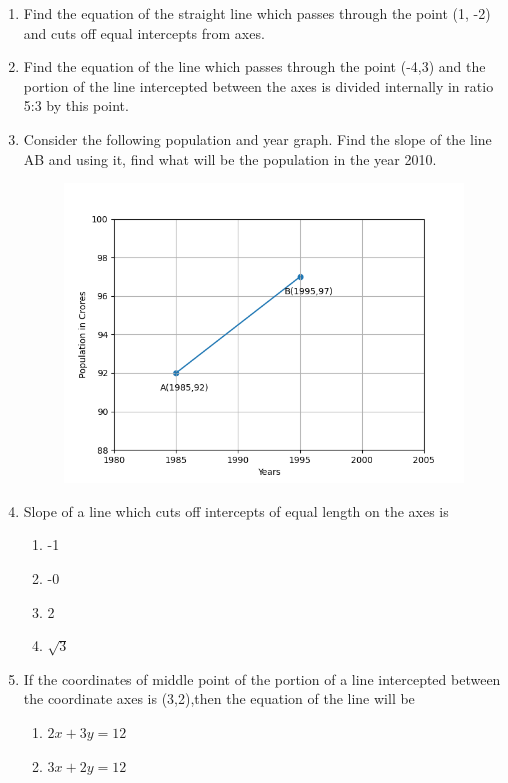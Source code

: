 \begin{enumerate}[label=\thesubsection.\arabic*,ref=\thesubsection.\theenumi]
\item Find the equation of the straight line which passes through the point (1, -2) and cuts off equal intercepts from axes.
\item Find the equation of the line which passes through the point (-4,3) and the portion of the line intercepted between the axes is divided internally in ratio 5:3 by this point.
\item Consider the following population and year graph. Find the slope of the line AB and using it, find what will be the population in the year 2010.
\\
\begin{figure}[!ht]
\centering
\includegraphics[width = \columnwidth]{chapters/11/10/1/14/figs/fig.png}
\caption{}
\label{fig:chapters/11/10/1/14/1}
\end{figure}
\solution

\item Slope of a line which cuts off intercepts of equal length on the axes is 
\begin{enumerate}
\item -1
\item -0
\item 2
\item $\sqrt{3}$
\end{enumerate}
\item If the coordinates of middle point of the portion of a line intercepted between the coordinate axes is (3,2),then the equation of the line will be
\begin{enumerate}
\item $2x+3y=12$
\item $3x+2y=12$

\end{enumerate}
\end{enumerate}
